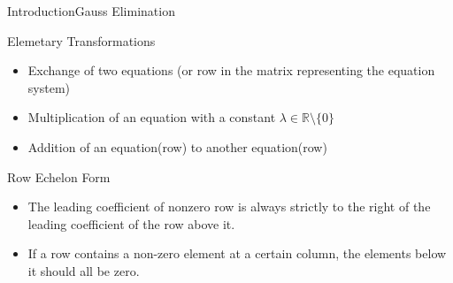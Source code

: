 \documentclass[10pt]{beamer}
\begin{document}
\begin{frame}{Introduction}{Gauss Elimination}

\begin{block}{Elemetary Transformations}
\begin{itemize}
\item Exchange of two equations (or row in the matrix representing the equation system)
\item Multiplication of an equation with a constant $\lambda \in \mathbb{R} \setminus \{0\}$
\item Addition of an equation(row) to another equation(row)
\end{itemize}
\end{block}


\begin{block}{Row Echelon Form}
\begin{itemize}
\item The leading coefficient of nonzero row is always strictly to the right of the leading coefficient of the row above it.
\item If a row contains a non-zero element at a certain column, the elements below it should all be zero.
\end{itemize}
\end{block}


\end{frame}
\end{document}
